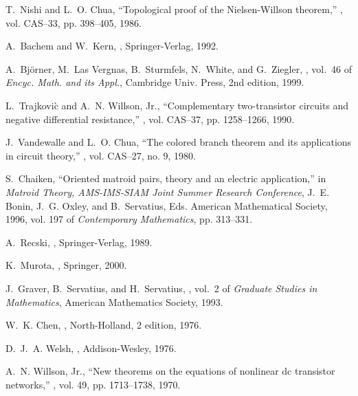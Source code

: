 \documentclass{article}
\begin{document}
\begin{thebibliography}{10}
T.~Nishi and L.~O. Chua,
\newblock ``Topological proof of the {N}ielsen-{W}illson theorem,''
, vol. CAS--33, pp. 398--405, 1986.

A.~Bachem and W.~Kern,
,
\newblock Springer-Verlag, 1992.

A.~Bj\"{o}rner, M.~Las Vergnas, B.~Sturmfels, N.~White, and G.~Ziegler,
, vol.~46 of {\em Encyc. Math. and its Appl.},
\newblock Cambridge Univ. Press, 2nd edition, 1999.

L.~Trajkovi\`{c} and A.~N. {Willson, Jr.},
\newblock ``Complementary two-transistor circuits and negative differential
  resistance,''
, vol. CAS--37, pp. 1258--1266, 1990.

J.~Vandewalle and L.~O. Chua,
\newblock ``The colored branch theorem and its applications in circuit
  theory,''
, vol. CAS--27, no. 9, 1980.

S.~Chaiken,
\newblock ``Oriented matroid pairs, theory and an electric application,''
\newblock in {\em Matroid Theory, AMS-IMS-SIAM Joint Summer Research
  Conference}, J.~E. Bonin, J.~G. Oxley, and B.~Servatius, Eds. American
  Mathematical Society, 1996, vol. 197 of {\em Contemporary Mathematics}, pp.
  313--331.

A.~Recski,
,
\newblock Springer-Verlag, 1989.

K.~Murota,
,
\newblock Springer, 2000.

J.~Graver, B.~Servatius, and H.~Servatius,
, vol.~2 of {\em Graduate Studies in
  Mathematics},
\newblock American Mathematics Society, 1993.

W.~K. Chen,
,
\newblock North-Holland, 2 edition, 1976.

D.~J.~A. Welsh,
,
\newblock Addison-Wesley, 1976.

A.~N. {Willson, Jr.},
\newblock ``New theorems on the equations of nonlinear dc transistor
  networks,''
, vol. 49, pp. 1713--1738, 1970.

\end{thebibliography}





\end{document}
